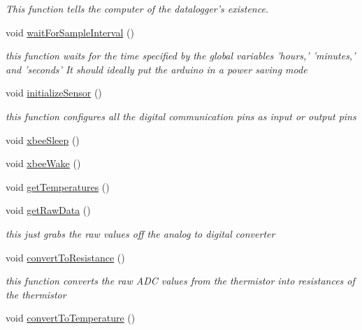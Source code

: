 \begin{CompactItemize}
\begin{CompactList}\small\item\em This function tells the computer of the datalogger's existence. \item\end{CompactList}\item 
void \hyperlink{applet_2temperature__sensor___terciopelo_8pde_b4dbd8380e5d93ead613cf38e6083b7f}{waitForSampleInterval} ()
\begin{CompactList}\small\item\em this function waits for the time specified by the global variables 'hours,' 'minutes,' and 'seconds' It should ideally put the arduino in a power saving mode \item\end{CompactList}\item 
void \hyperlink{applet_2temperature__sensor___terciopelo_8pde_f6c9587ccbcf223f8c79f508c2fef366}{initializeSensor} ()
\begin{CompactList}\small\item\em this function configures all the digital communication pins as input or output pins \item\end{CompactList}\item 
void \hyperlink{applet_2temperature__sensor___terciopelo_8pde_a06edc5122b70b3231ff87d8234fe759}{xbeeSleep} ()
\item 
void \hyperlink{applet_2temperature__sensor___terciopelo_8pde_884c5dd8e3bb500063c819db197db666}{xbeeWake} ()
\item 
void \hyperlink{applet_2temperature__sensor___terciopelo_8pde_ea28af0c7128421a38589128bb39ef1c}{getTemperatures} ()
\item 
void \hyperlink{applet_2temperature__sensor___terciopelo_8pde_cfc975251dbc3a8c9a9b11f8df62cc41}{getRawData} ()
\begin{CompactList}\small\item\em this just grabs the raw values off the analog to digital converter \item\end{CompactList}\item 
void \hyperlink{applet_2temperature__sensor___terciopelo_8pde_8e666a34a083b1806167ca991be0c436}{convertToResistance} ()
\begin{CompactList}\small\item\em this function converts the raw ADC values from the thermistor into resistances of the thermistor \item\end{CompactList}\item 
void \hyperlink{applet_2temperature__sensor___terciopelo_8pde_3aa4f99331713009a70ee34eba83754b}{convertToTemperature} ()
\end{CompactItemize}
